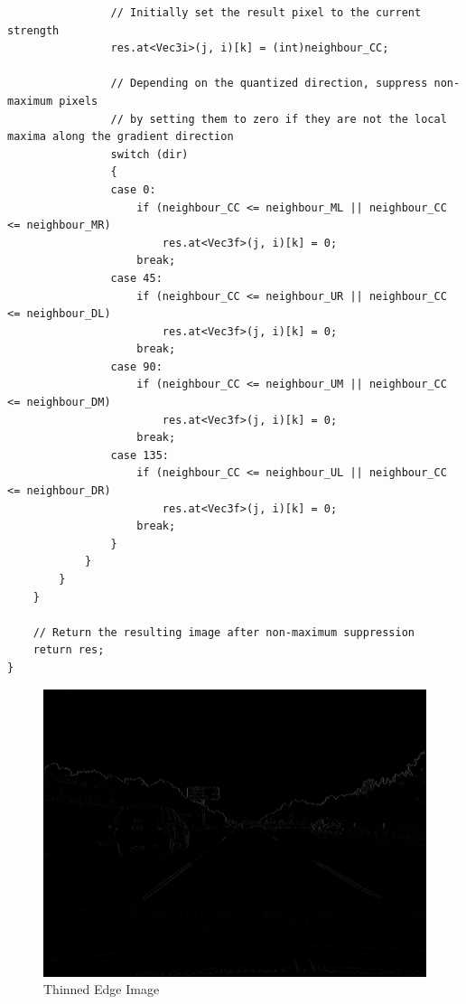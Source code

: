 \documentclass[12pt,a4paper]{report}
\begin{document}
\begin{lstlisting}
                // Initially set the result pixel to the current strength
                res.at<Vec3i>(j, i)[k] = (int)neighbour_CC;

                // Depending on the quantized direction, suppress non-maximum pixels
                // by setting them to zero if they are not the local maxima along the gradient direction
                switch (dir)
                {
                case 0:
                    if (neighbour_CC <= neighbour_ML || neighbour_CC <= neighbour_MR)
                        res.at<Vec3f>(j, i)[k] = 0;
                    break;
                case 45:
                    if (neighbour_CC <= neighbour_UR || neighbour_CC <= neighbour_DL)
                        res.at<Vec3f>(j, i)[k] = 0;
                    break;
                case 90:
                    if (neighbour_CC <= neighbour_UM || neighbour_CC <= neighbour_DM)
                        res.at<Vec3f>(j, i)[k] = 0;
                    break;
                case 135:
                    if (neighbour_CC <= neighbour_UL || neighbour_CC <= neighbour_DR)
                        res.at<Vec3f>(j, i)[k] = 0;
                    break;
                }
            }
        }
    }

    // Return the resulting image after non-maximum suppression
    return res;
}
\end{lstlisting}
\begin{figure}[!htb]
  \centering
  \includegraphics[height=0.4\paperheight]{output/img2_q2_NMS.png}
  \caption{Thinned Edge Image}
\end{figure}
\clearpage
\end{document}
